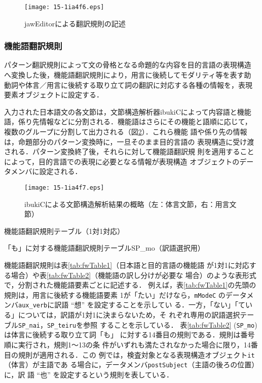 \documentclass[japanese]{jnlp_1.4}
\begin{document}
\begin{figure}[t]
  \centering
      \texttt{[image: 15-1ia4f6.eps]}
  \caption{jawEditorによる翻訳規則の記述}
  \label{fig:TransferRule}
\end{figure}



\subsubsection{機能語翻訳規則}
\label{sec:fw}

パターン翻訳規則によって文の骨格となる命題的な内容を目的言語の表現構造
へ変換した後，機能語翻訳規則により，用言に後続してモダリティ等を表す助
動詞や体言／用言に後続する取り立て詞の翻訳に対応する各種の情報を，表現
要素オブジェクトに設定する．

入力された日本語文の各文節は，文節構造解析器ibukiCによって内容語と機能
語，係り先情報などに分割される．機能語はさらにその機能と語順に応じて，
複数のグループに分割して出力される（図\ref{fig:ibukiC_fw}）．これら機能
語や係り先の情報は，命題部分のパターン変換時に，一旦そのまま目的言語の
表現構造に受け渡される．パターン変換終了後，それらに対して機能語翻訳規
則を適用することによって，目的言語での表現に必要となる情報が表現構造
オブジェクトのデータメンバに設定される．

\begin{figure}[t]
  \centering
      \texttt{[image: 15-1ia4f7.eps]}
  \caption{ibukiCによる文節構造解析結果の概略（左：体言文節，右：用言文節）}
  \label{fig:ibukiC_fw}
\end{figure}
\begin{table}[t]
  \caption{機能語翻訳規則テーブル（1対1対応）}
  \label{tab:fwTable1}
  \centering

\end{table}
\begin{table}[t]
  \caption{「も」に対する機能語翻訳規則テーブルSP\_mo（訳語選択用）}
  \label{tab:fwTable2}
  \centering

\end{table}

機能語翻訳規則は表\ref{tab:fwTable1}（日本語と目的言語の機能語
が1対1に対応する場合）や表\ref{tab:fwTable2}（機能語の訳し分けが必要な
場合）のような表形式で，分割された機能語要素ごとに記述する．
例えば，表\ref{tab:fwTable1}の先頭の規則は，用言に後続する機能語要素
1が「たい」だけなら，\texttt{mModeC}
のデータメンバ\texttt{aux\_verb}に訳語 ``想'' を設定することを示してい
る．一方，「ない」「ている」については，訳語が1対1に決まらないため，そ
れぞれ専用の訳語選択テーブル\texttt{SP\_nai}，\texttt{SP\_teiru}を参照
することを示している．
表\ref{tab:fwTable2} (\texttt{SP\_mo}) は体言に後続する取り立て詞「も」
に対する14番目の規則である．規則は番号順に実行され，規則1〜13の条
件がいずれも満たされなかった場合に限り，14番目の規則が適用される．この
例では，検査対象となる表現構造オブジェクト\texttt{it}（体言）が主語であ
る場合に，データメンバ\texttt{postSubject}（主語の後ろの位置）に，訳
語 ``也'' を設定するという規則を表している．
\end{document}
